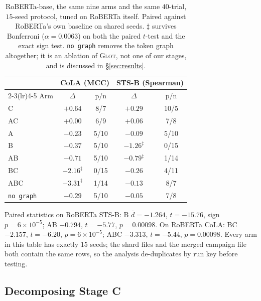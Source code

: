 \documentclass{article}
\begin{document}
\begin{table}[h]
\caption{RoBERTa-base, the same nine arms and the same $40$-trial, $15$-seed
protocol, tuned on RoBERTa itself. Paired against RoBERTa's own baseline on
shared seeds. $\ddagger$ survives Bonferroni ($\alpha=0.0063$) on both the
paired $t$-test and the exact sign test. \texttt{no graph} removes the token
graph altogether; it is an ablation of \textsc{Glot}, not one of our stages, and
is discussed in \S\ref{sec:results}.}
\label{tab:robarms}
\begin{center}
\small
\begin{tabular}{lcccc}
\toprule
 & \multicolumn{2}{c}{CoLA (MCC)} & \multicolumn{2}{c}{STS-B (Spearman)} \\
\cmidrule(lr){2-3}\cmidrule(lr){4-5}
Arm & $\Delta$ & p/n & $\Delta$ & p/n \\
\midrule
C   & $\mathbf{+0.64}$ & \phantom{0}8/7 & $\mathbf{+0.29}$ & 10/5 \\
AC  & $+0.00$ & \phantom{0}6/9 & $+0.06$ & \phantom{0}7/8 \\
A   & $-0.23$ & \phantom{0}5/10 & $-0.09$ & \phantom{0}5/10 \\
\midrule
B   & $-0.37$ & \phantom{0}5/10 & $-1.26^{\ddagger}$ & \phantom{0}0/15 \\
AB  & $-0.71$ & \phantom{0}5/10 & $-0.79^{\ddagger}$ & \phantom{0}1/14 \\
BC  & $-2.16^{\ddagger}$ & \phantom{0}0/15 & $-0.26$ & \phantom{0}4/11 \\
ABC & $-3.31^{\ddagger}$ & \phantom{0}1/14 & $-0.13$ & \phantom{0}8/7 \\
\midrule
\texttt{no graph} & $-0.29$ & \phantom{0}5/10 & $-0.05$ & \phantom{0}7/8 \\
\bottomrule
\end{tabular}
\end{center}
\end{table}

Paired statistics on RoBERTa STS-B: B $\bar{d}=-1.264$, $t=-15.76$, sign
$p=6\times10^{-5}$; AB $-0.794$, $t=-5.77$, $p=0.00098$. On RoBERTa CoLA: BC
$-2.157$, $t=-6.20$, $p=6\times10^{-5}$; ABC $-3.313$, $t=-5.44$, $p=0.00098$.
Every arm in this table has exactly $15$ seeds; the shard files and the merged
campaign file both contain the same rows, so the analysis de-duplicates by run
key before testing.

\subsection{Decomposing Stage C}
\label{app:factorial2x2}
\end{document}
